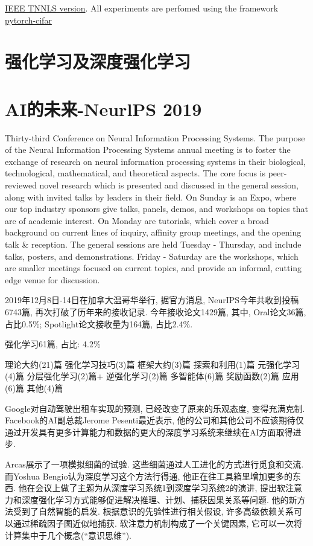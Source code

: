 \href{https://ieeexplore.ieee.org/document/8939562}{IEEE TNNLS version}.
All experiments are perfomed using the framework \href{https://github.com/kuangliu/pytorch-cifar}{pytorch-cifar}
\section{强化学习及深度强化学习}
\section{AI的未来-NeurlPS 2019}
Thirty-third Conference on Neural Information Processing Systems. The purpose of the Neural Information Processing Systems annual meeting is to foster the exchange of research on neural information processing systems in their biological, technological, mathematical, and theoretical aspects. The core focus is peer-reviewed novel research which is presented and discussed in the general session, along with invited talks by leaders in their field. On Sunday is an Expo, where our top industry sponsors give talks, panels, demos, and workshops on topics that are of academic interest. On Monday are tutorials, which cover a broad background on current lines of inquiry, affinity group meetings, and the opening talk \& reception. The general sessions are held Tuesday - Thursday, and include talks, posters, and demonstrations. Friday - Saturday are the workshops, which are smaller meetings focused on current topics, and provide an informal, cutting edge venue for discussion.

2019年12月8日-14日在加拿大温哥华举行, 据官方消息, NeurIPS今年共收到投稿6743篇, 再次打破了历年来的接收记录. 今年接收论文1429篇, 其中, Oral论文36篇, 占比0.5\%; Spotlight论文接收量为164篇, 占比2.4\%.

强化学习61篇, 占比: 4.2\%

理论大约(21)篇 强化学习技巧(3)篇 框架大约(3)篇 探索和利用(1)篇 元强化学习(4)篇 分层强化学习(2)篇+ 逆强化学习(2)篇 多智能体(6)篇 奖励函数(2)篇 应用(6)篇 其他(4)篇

Google对自动驾驶出租车实现的预测, 已经改变了原来的乐观态度, 变得充满克制.
Facebook的AI副总裁Jerome Pesenti最近表示, 他的公司和其他公司不应该期待仅通过开发具有更多计算能力和数据的更大的深度学习系统来继续在AI方面取得进步.

Arcas展示了一项模拟细菌的试验. 这些细菌通过人工进化的方式进行觅食和交流.
而Yoshua Bengio认为深度学习这个方法行得通, 他正在往工具箱里增加更多的东西.
他在会议上做了主题为从深度学习系统1到深度学习系统2的演讲, 提出软注意力和深度强化学习方式能够促进解决推理、计划、捕获因果关系等问题.
他的新方法受到了自然智能的启发. 根据意识的先验性进行相关假设, 许多高级依赖关系可以通过稀疏因子图近似地捕获. 软注意力机制构成了一个关键因素, 它可以一次将计算集中于几个概念(“意识思维”).

